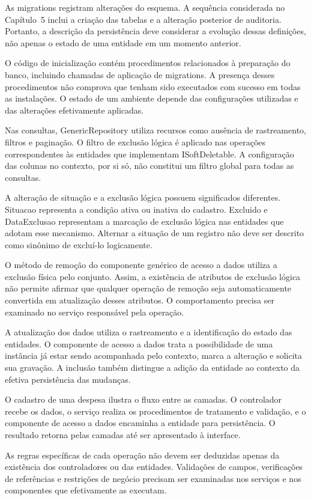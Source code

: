 As migrations registram alterações do esquema. A sequência considerada no Capítulo~5 inclui a criação das tabelas e a alteração posterior de auditoria. Portanto, a descrição da persistência deve considerar a evolução dessas definições, não apenas o estado de uma entidade em um momento anterior.

O código de inicialização contém procedimentos relacionados à preparação do banco, incluindo chamadas de aplicação de migrations. A presença desses procedimentos não comprova que tenham sido executados com sucesso em todas as instalações. O estado de um ambiente depende das configurações utilizadas e das alterações efetivamente aplicadas.

Nas consultas, GenericRepository utiliza recursos como ausência de rastreamento, filtros e paginação. O filtro de exclusão lógica é aplicado nas operações correspondentes às entidades que implementam ISoftDeletable. A configuração das colunas no contexto, por si só, não constitui um filtro global para todas as consultas.

A alteração de situação e a exclusão lógica possuem significados diferentes. Situacao representa a condição ativa ou inativa do cadastro. Excluido e DataExclusao representam a marcação de exclusão lógica nas entidades que adotam esse mecanismo. Alternar a situação de um registro não deve ser descrito como sinônimo de excluí-lo logicamente.

O método de remoção do componente genérico de acesso a dados utiliza a exclusão física pelo conjunto. Assim, a existência de atributos de exclusão lógica não permite afirmar que qualquer operação de remoção seja automaticamente convertida em atualização desses atributos. O comportamento precisa ser examinado no serviço responsável pela operação.

A atualização dos dados utiliza o rastreamento e a identificação do estado das entidades. O componente de acesso a dados trata a possibilidade de uma instância já estar sendo acompanhada pelo contexto, marca a alteração e solicita sua gravação. A inclusão também distingue a adição da entidade ao contexto da efetiva persistência das mudanças.

O cadastro de uma despesa ilustra o fluxo entre as camadas. O controlador recebe os dados, o serviço realiza os procedimentos de tratamento e validação, e o componente de acesso a dados encaminha a entidade para persistência. O resultado retorna pelas camadas até ser apresentado à interface.

As regras específicas de cada operação não devem ser deduzidas apenas da existência dos controladores ou das entidades. Validações de campos, verificações de referências e restrições de negócio precisam ser examinadas nos serviços e nos componentes que efetivamente as executam.

